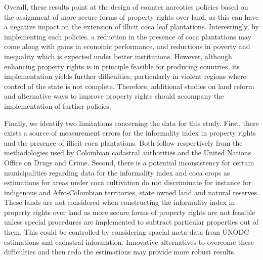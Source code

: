 Overall, these results point at the design of counter narcotics policies based on the assignment of more secure forms of property rights over land, as this can have a negative impact on the extension of illicit coca leaf plantations. Interestingly, by implementing such policies, a reduction in the presence of coca plantations may come along with gains in economic performance, and reductions in poverty and inequality which is expected under better institutions. However, although enhancing property rights is in principle feasible for producing countries, its implementation yields further difficulties, particularly in violent regions where control of the state is not complete. Therefore, additional studies on land reform and alternative ways to improve property rights should accompany the implementation of further policies.

Finally, we identify two limitations concerning the data for this study. First, there exists a source of measurement errors for the informality index in property rights and the presence of illicit coca plantations. Both follow respectively from the methodologies used by Colombian cadastral authorities and the United Nations Office on Drugs and Crime. Second, there is a potential inconsistency for certain municipalities regarding data for the informality index and coca crops as estimations for areas under coca cultivation do not discriminate for instance for indigenous and Afro-Colombian territories, state owned land and natural reserves. These lands are not considered when constructing the informality index in property rights over land as more secure forms of property rights are not feasible unless special procedures are implemented to subtract particular properties out of them. This could be controlled by considering spacial meta-data from UNODC estimations and cadastral information. Innovative alternatives to overcome these difficulties and then redo the estimations may provide more robust results.

\newpage


